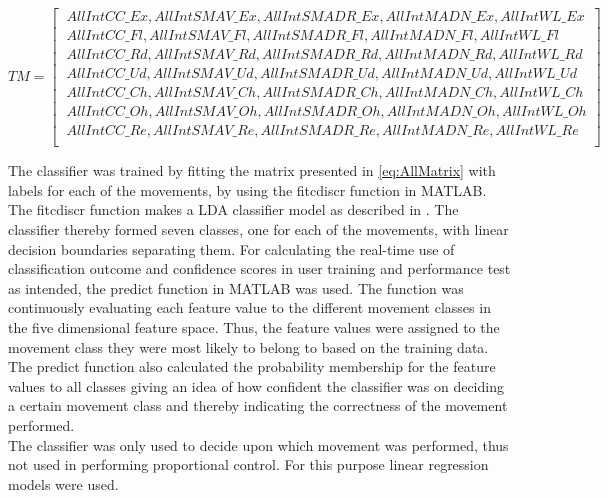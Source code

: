 \begin{footnotesize}
 \begin{equation} \label{eq:AllMatrix}
TM=\begin{bmatrix} 
\ AllIntCC\_Ex, AllIntSMAV\_Ex, AllIntSMADR\_Ex, AllIntMADN\_Ex, AllIntWL\_Ex \\
\ AllIntCC\_Fl, AllIntSMAV\_Fl, AllIntSMADR\_Fl, AllIntMADN\_Fl, AllIntWL\_Fl \\
\ AllIntCC\_Rd, AllIntSMAV\_Rd, AllIntSMADR\_Rd, AllIntMADN\_Rd, AllIntWL\_Rd \\
\ AllIntCC\_Ud, AllIntSMAV\_Ud, AllIntSMADR\_Ud, AllIntMADN\_Ud, AllIntWL\_Ud \\
\ AllIntCC\_Ch, AllIntSMAV\_Ch, AllIntSMADR\_Ch, AllIntMADN\_Ch, AllIntWL\_Ch \\
\ AllIntCC\_Oh, AllIntSMAV\_Oh, AllIntSMADR\_Oh, AllIntMADN\_Oh, AllIntWL\_Oh \\
\ AllIntCC\_Re, AllIntSMAV\_Re, AllIntSMADR\_Re, AllIntMADN\_Re, AllIntWL\_Re \\
\end{bmatrix}
\end{equation}
\end{footnotesize}

The classifier was trained by fitting the matrix presented in \eqref{eq:AllMatrix} with labels for each of the movements, by using the fitcdiscr function in MATLAB. %
The fitcdiscr function makes a LDA classifier model as described in .
The classifier thereby formed seven classes, one for each of the movements, with linear decision boundaries separating them. For calculating the real-time use of classification outcome and confidence scores in user training and performance test as intended, the predict function in MATLAB was used. The function was continuously evaluating each feature value to the different movement classes in the five dimensional feature space. Thus, the feature values were assigned to the movement class they were most likely to belong to based on the training data. The predict function also calculated the probability membership for the feature values to all classes giving an idea of how confident the classifier was on deciding a certain movement class and thereby indicating the correctness of the movement performed. \\ 
The classifier was only used to decide upon which movement was performed, thus not used in performing proportional control. For this purpose linear regression models were used. 


